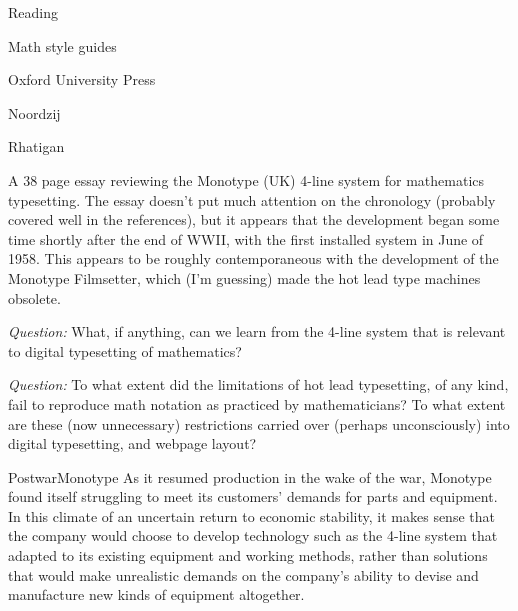 \documentclass[11pt]{PalisadesLakesBook}
\begin{document}
\begin{plSection}{Reading}
\begin{plSection}{Math style guides}
\begin{plSection}{Oxford University Press}
\end{plSection}%
\end{plSection}%
\begin{plSection}{Noordzij}



\end{plSection}%
\begin{plSection}{Rhatigan}
\begin{plSection}{}
\label{sec:FourLine}

A 38 page essay reviewing the Monotype (UK)
4-line system for mathematics typesetting.
The essay doesn't put much attention on the chronology
(probably covered well in the references),
but it appears that the development
began some time shortly after the end of WWII,
with the first installed system in June of 1958.
This appears to be roughly contemporaneous with
the development of the Monotype Filmsetter,
which (I'm guessing) made the hot lead type machines 
obsolete.~\cite{Eye:2012:MonotypeTimeline}

\emph{Question:} What, if anything, can we learn from the
4-line system that is relevant to digital typesetting
of mathematics?

\emph{Question:} To what extent did the limitations of
hot lead typesetting, of any kind, 
fail to reproduce math notation as practiced by mathematicians?
To what extent are these (now unnecessary) restrictions
carried over (perhaps unconsciously) into digital typesetting,
and webpage layout?

\begin{plQuote}
{}
{PostwarMonotype}
As it resumed production in the wake of the war,
Monotype found itself struggling to meet its customers'
demands for parts and equipment. 
In this climate of an uncertain return to economic stability,
it makes sense that the company would choose to develop
technology such as the 4-line system that adapted to its existing
equipment and working methods, 
rather than solutions that would make unrealistic demands
on the company's ability to devise and manufacture 
new kinds of equipment altogether. 
\end{plQuote}


\end{plSection}
\end{plSection}
\end{plSection}
\end{document}
